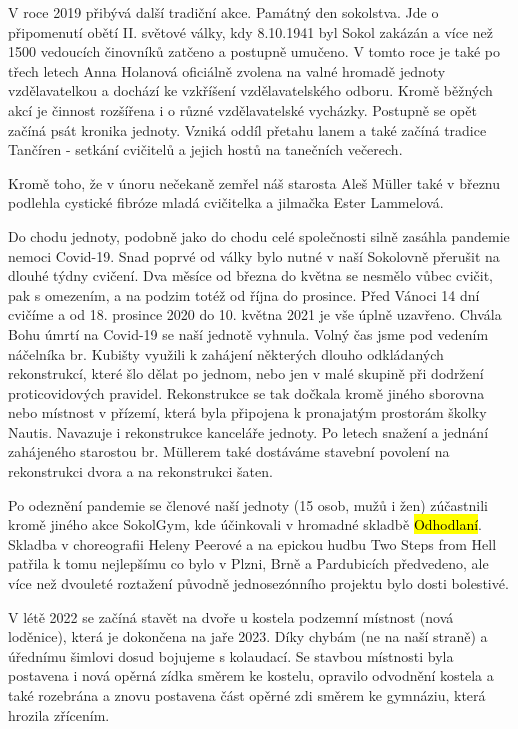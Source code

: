 V roce 2019 přibývá další tradiční akce. Památný den sokolstva. Jde o
připomenutí obětí II. světové války, kdy 8.10.1941 byl Sokol zakázán a
více než 1500 vedoucích činovníků zatčeno a postupně umučeno. V tomto
roce je také po třech letech Anna Holanová oficiálně zvolena na valné
hromadě jednoty vzdělavatelkou a dochází ke vzkříšení vzdělavatelského
odboru. Kromě běžných akcí je činnost rozšířena i o různé vzdělavatelské
vycházky. Postupně se opět začíná psát kronika jednoty. Vzniká oddíl
přetahu lanem a také začíná tradice Tančíren - setkání cvičitelů a
jejich hostů na tanečních večerech.

Kromě toho, že v únoru nečekaně zemřel náš starosta Aleš Müller také v
březnu podlehla cystické fibróze mladá cvičitelka a jilmačka Ester
Lammelová.

Do chodu jednoty, podobně jako do chodu celé společnosti silně zasáhla
pandemie nemoci Covid-19. Snad poprvé od války bylo nutné v naší
Sokolovně přerušit na dlouhé týdny cvičení. Dva měsíce od března do
května se nesmělo vůbec cvičit, pak s omezením, a na podzim totéž od
října do prosince. Před Vánoci 14 dní cvičíme a od 18. prosince 2020 do
10. května 2021 je vše úplně uzavřeno. Chvála Bohu úmrtí na Covid-19 se
naší jednotě vyhnula. Volný čas jsme pod vedením náčelníka br. Kubišty
využili k zahájení některých dlouho odkládaných rekonstrukcí, které šlo
dělat po jednom, nebo jen v malé skupině při dodržení proticovidových
pravidel. Rekonstrukce se tak dočkala kromě jiného sborovna nebo
místnost v přízemí, která byla připojena k pronajatým prostorám školky
Nautis. Navazuje i rekonstrukce kanceláře jednoty. Po letech snažení a
jednání zahájeného starostou br. Müllerem také dostáváme stavební
povolení na rekonstrukci dvora a na rekonstrukci šaten.

Po odeznění pandemie se členové naší jednoty (15 osob, mužů i žen)
zúčastnili kromě jiného akce SokolGym, kde účinkovali v hromadné skladbě
\hl{Odhodlaní}. Skladba v choreografii Heleny Peerové a na epickou hudbu
Two Steps from Hell patřila k tomu nejlepšímu co bylo v Plzni, Brně a
Pardubicích předvedeno, ale více než dvouleté roztažení původně
jednosezónního projektu bylo dosti bolestivé.

V létě 2022 se začíná stavět na dvoře u kostela podzemní místnost (nová
loděnice), která je dokončena na jaře 2023. Díky chybám (ne na naší
straně) a úřednímu šimlovi dosud bojujeme s kolaudací. Se stavbou
místnosti byla postavena i nová opěrná zídka směrem ke kostelu, opravilo
odvodnění kostela a také rozebrána a znovu postavena část opěrné zdi
směrem ke gymnáziu, která hrozila zřícením.

